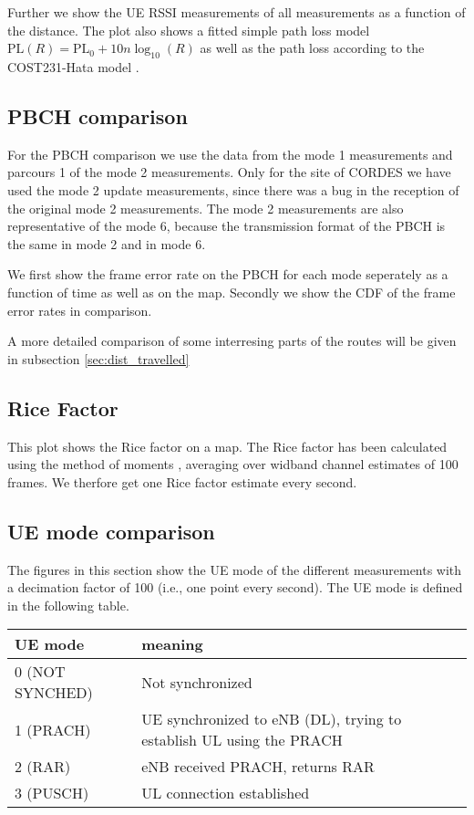 \documentclass[a4paper,10pt]{article}
\begin{document}
Further we show the UE RSSI measurements of all measurements as a function of the distance. The plot also shows a fitted simple path loss model $\mathrm{PL}(R) = \mathrm{PL}_0 + 10n\log_{10}(R)$ as well as the path loss according to the COST231-Hata model \cite{cost231}.

\subsection{PBCH comparison}

For the PBCH comparison we use the data from the mode 1 measurements and parcours 1 of the mode 2 measurements. Only for the site of CORDES we have used the mode 2 update measurements, since there was a bug in the reception of the original mode 2 measurements. The mode 2 measurements are also representative of the mode 6, because the transmission format of the PBCH is the same in mode 2 and in mode 6. 

We first show the frame error rate on the PBCH for each mode seperately as a function of time as well as on the map. Secondly we show the CDF of the frame error rates in comparison. 


A more detailed comparison of some interresing parts of the routes will be given in subsection \ref{sec:dist_travelled}

\subsection{Rice Factor}
This plot shows the Rice factor on a map. The Rice factor has been calculated using the method of moments \cite{Greenstein1999}, averaging over widband channel estimates of 100 frames. We therfore get one Rice factor estimate every second. 

\subsection{UE mode comparison}
The figures in this section show the UE mode of the different measurements with a decimation factor of 100 (i.e., one point every second). The UE mode is defined in the following table.

\begin{center}
\begin{tabular}{l|p{6cm}}
UE mode & meaning \\ 
\hline
0 (NOT SYNCHED) & Not synchronized \\ 
1 (PRACH) & UE synchronized to eNB (DL), trying to establish UL using the PRACH\\ 
2 (RAR) & eNB received PRACH, returns RAR \\ 
3 (PUSCH) & UL connection established
\end{tabular}
\end{center}
\end{document}
